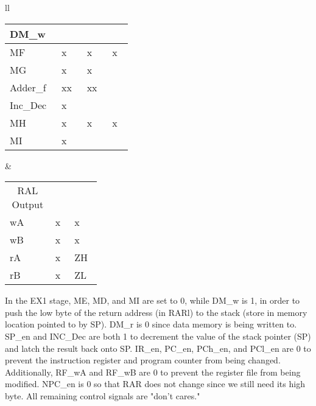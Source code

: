 \documentclass[11pt]{article}
\begin{document}
\begin{enumerate}[leftmargin=0.2in]
\begin{enumerate}
\begin{table}[H]
\begin{tabular}{ll}
\begin{tabular}{|p{0.1\linewidth}|>{\centering\arraybackslash}p{0.1\linewidth}|>{\centering\arraybackslash}p{0.1\linewidth}|>{\centering\arraybackslash}p{0.1\linewidth}|}
            DM\_w     & 0     & 1     & 1     \\ \hline
            MF        & x     & x     & x     \\ \hline
            MG        & x     & x     & 1     \\ \hline
            Adder\_f  & xx    & xx    & 11    \\ \hline
            Inc\_Dec  & x     & 1     & 1     \\ \hline
            MH        & x     & x     & x     \\ \hline
            MI        & x     & 0     & 1     \\ \hline
          \end{tabular}
          &
          \begin{tabular}{|p{0.1\linewidth}|>{\centering\arraybackslash}p{0.1\linewidth}|>{\centering\arraybackslash}p{0.1\linewidth}|}\hline
            \multicolumn{1}{|c|}{\multirow{2}{0.1\linewidth}{RAL Output}} & \multicolumn{2}{c|}{\texttt{ICALL}} \\ \cline{2-3} 
            \multicolumn{1}{|c|}{} & \multicolumn{1}{c|}{EX1} & \multicolumn{1}{c|}{EX2} \\ \hhline{|=|=|=|}
            wA & x & x \\ \hline
            wB & x & x \\ \hline
            rA & x & ZH \\ \hline
            rB & x & ZL \\ \hline
          \end{tabular}
        \end{tabular}
        \label{tab:3b}
      \end{table}

      In the EX1 stage, ME, MD, and MI are set to 0, while DM\_w is 1, in order to push the low byte of the return address (in RARl) to the stack (store in memory location pointed to by SP). DM\_r is 0 since data memory is being written to. SP\_en and INC\_Dec are both 1 to decrement the value of the stack pointer (SP) and latch the result back onto SP. IR\_en, PC\_en, PCh\_en, and PCl\_en are 0 to prevent the instruction register and program counter from being changed. Additionally, RF\_wA and RF\_wB are 0 to prevent the register file from being modified. NPC\_en is 0 so that RAR does not change since we still need its high byte. All remaining control signals are "don't cares."\\


\end{enumerate}
\end{enumerate}
\end{document}
